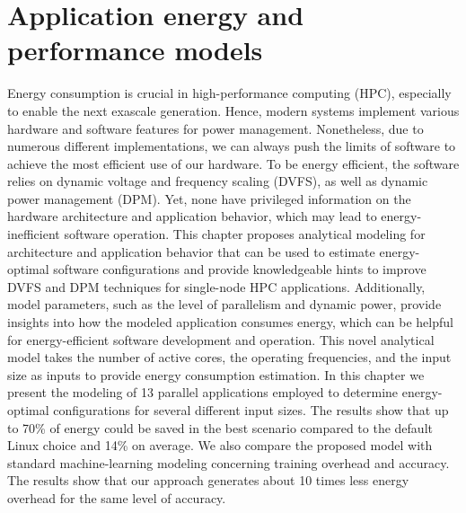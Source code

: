 \documentclass[
papersize=a4,
pagelayout=default,
fontname=latinmodern,
fontsize=11pt,
twoside,
final,
faculty=fpms,
]{umons-Thesis}
\begin{document}
	\chapter{Application energy and performance models} \label{chapter:models}
	Energy consumption is crucial in high-performance computing (HPC), especially to enable the next exascale generation. Hence, modern systems implement various hardware and software features for power management. Nonetheless, due to numerous different implementations, we can always push the limits of software to achieve the most efficient use of our hardware. To be energy efficient, the software relies on dynamic voltage and frequency scaling (DVFS), as well as dynamic power management (DPM). Yet, none have privileged information on the hardware architecture and application behavior, which may lead to energy-inefficient software operation. 
	This chapter proposes analytical modeling for architecture and application behavior that can be used to estimate energy-optimal software configurations and provide knowledgeable hints to improve DVFS and DPM techniques for single-node HPC applications.
	Additionally, model parameters, such as the level of parallelism and dynamic power, provide insights into how the modeled application consumes energy, which can be helpful for energy-efficient software development and operation.
	This novel analytical model takes the number of active cores, the operating frequencies, and the input size as inputs to provide energy consumption estimation.
	In this chapter we present the modeling of 13 parallel applications employed to determine energy-optimal configurations for several different input sizes.
	The results show that up to 70\% of energy could be saved in the best scenario compared to the default Linux choice and 14\% on average.
	We also compare the proposed model with standard machine-learning modeling concerning training overhead and accuracy. The results show that our approach generates about 10 times less energy overhead for the same level of accuracy.
	
	
	
\end{document}
